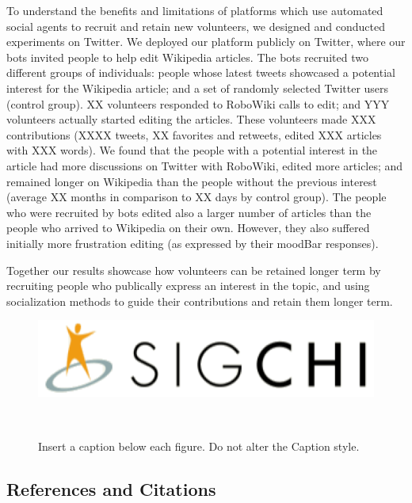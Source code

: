 \documentclass{sigchi}
\begin{document}
To understand the benefits and limitations of platforms which use automated social agents to recruit and retain new volunteers, we designed and conducted experiments on Twitter.  We deployed our platform publicly on Twitter, where our bots invited people to help edit Wikipedia articles. The bots recruited two different groups of individuals: people whose latest tweets showcased a potential interest for the Wikipedia article; and a set of randomly selected Twitter users (control group).  XX  volunteers responded to RoboWiki calls to edit; and YYY volunteers actually started editing the articles. These volunteers made XXX contributions (XXXX tweets,  XX favorites and retweets, edited XXX articles with XXX words). We found that the people with a potential interest in the article had more discussions on Twitter with 
RoboWiki, edited more articles; and remained longer on Wikipedia than the people without the previous interest (average XX months in comparison to XX days by control group). The people who were recruited by bots edited also a larger number of articles than the people who arrived to Wikipedia on their own. However, they also suffered initially more frustration editing (as expressed by their moodBar responses).

Together our results showcase how volunteers can be retained longer term  by recruiting people  who publically express an interest in the topic, and using socialization methods to guide their contributions and retain them longer term.


\begin{figure}
\centering
  \includegraphics[width=0.9\columnwidth]{figures/sigchi-logo}
  \caption{Insert a caption below each figure. Do not alter the
    Caption style.}~\label{fig:figure1}
\end{figure}

\subsection{References and Citations}
\end{document}

